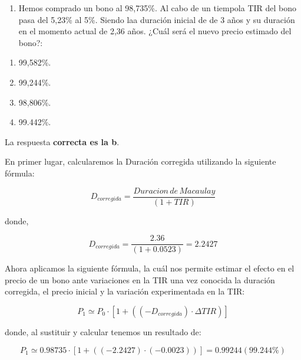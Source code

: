 \documentclass[
  letterpaper,
  DIV=11,
  numbers=noendperiod]{scrartcl}
\providecommand{\tightlist}{%
  \setlength{\itemsep}{0pt}\setlength{\parskip}{0pt}}\usepackage{longtable,booktabs,array}
\begin{document}
\begin{enumerate}
\def\labelenumi{\arabic{enumi}.}
\setcounter{enumi}{7}
\tightlist
\item
  Hemos comprado un bono al 98,735\%. Al cabo de un tiempola TIR del
  bono pasa del 5,23\% al 5\%. Siendo laa duración inicial de de 3 años
  y su duración en el momento actual de 2,36 años. ¿Cuál será el nuevo
  precio estimado del bono?:
\end{enumerate}

\begin{enumerate}
\def\labelenumi{\alph{enumi}.}
\item
  99,582\%.
\item
  99,244\%.
\item
  98,806\%.
\item
  99.442\%.
\end{enumerate}

\begin{tcolorbox}[enhanced jigsaw, colframe=quarto-callout-note-color-frame, opacityback=0, colback=white, leftrule=.75mm, left=2mm, breakable, arc=.35mm, rightrule=.15mm, toprule=.15mm, bottomrule=.15mm]
\begin{minipage}[t]{5.5mm}
\textcolor{quarto-callout-note-color}{\faInfo}
\end{minipage}%
\begin{minipage}[t]{\textwidth - 5.5mm}

La respuesta \textbf{correcta es la b}.

En primer lugar, calcularemos la Duración corregida utilizando la
siguiente fórmula:

\[D_{corregida}=\frac{Duracion\,de\, Macaulay}{\left(1+TIR\right)}\]

donde,

\[D_{corregida}=\frac{2.36}{(1+0.0523)}=2.2427\]

Ahora aplicamos la siguiente fórmula, la cuál nos permite estimar el
efecto en el precio de un bono ante variaciones en la TIR una vez
conocida la duración corregida, el precio inicial y la variación
experimentada en la TIR:

\[P_1\simeq P_0\cdot\left[1+((-D_{corregida})\cdot\Delta TIR)\right]\]

donde, al sustituir y calcular tenemos un resultado de:

\[P_1\simeq 0.98735\cdot\left[1+((-2.2427)\cdot (-0.0023))\right]=0.99244(99.244\%)\]

\end{minipage}%
\end{tcolorbox}
\end{document}
